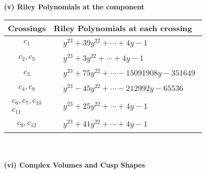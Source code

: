 \documentclass[1p]{elsarticle_modified}
\theoremstyle{definition}
\begin{document}
\newpage\renewcommand{\arraystretch}{1}
\flushleft \textbf{(v) Riley Polynomials at the component}\newline \\
\begin{tabular}{m{50pt}|m{274pt}}
Crossings & \hspace{64pt}Riley Polynomials at each crossing \\
\hline $$\begin{aligned}c_{1}\end{aligned}$$&$\begin{aligned}
&y^{23}+39 y^{22}+\cdots+4 y-1
\end{aligned}$\\
\hline $$\begin{aligned}c_{2},c_{5}\end{aligned}$$&$\begin{aligned}
&y^{23}+3 y^{22}+\cdots+4 y-1
\end{aligned}$\\
\hline $$\begin{aligned}c_{3}\end{aligned}$$&$\begin{aligned}
&y^{23}+75 y^{22}+\cdots-15091908 y-351649
\end{aligned}$\\
\hline $$\begin{aligned}c_{4},c_{8}\end{aligned}$$&$\begin{aligned}
&y^{23}-45 y^{22}+\cdots-212992 y-65536
\end{aligned}$\\
\hline $$\begin{aligned}c_{6},c_{7},c_{10}\\c_{11}\end{aligned}$$&$\begin{aligned}
&y^{23}+25 y^{22}+\cdots+4 y-1
\end{aligned}$\\
\hline $$\begin{aligned}c_{9},c_{12}\end{aligned}$$&$\begin{aligned}
&y^{23}+41 y^{22}+\cdots+4 y-1
\end{aligned}$\\
\hline
\end{tabular}\\~\\
\newpage\flushleft \textbf{(vi) Complex Volumes and Cusp Shapes}
\end{document}
